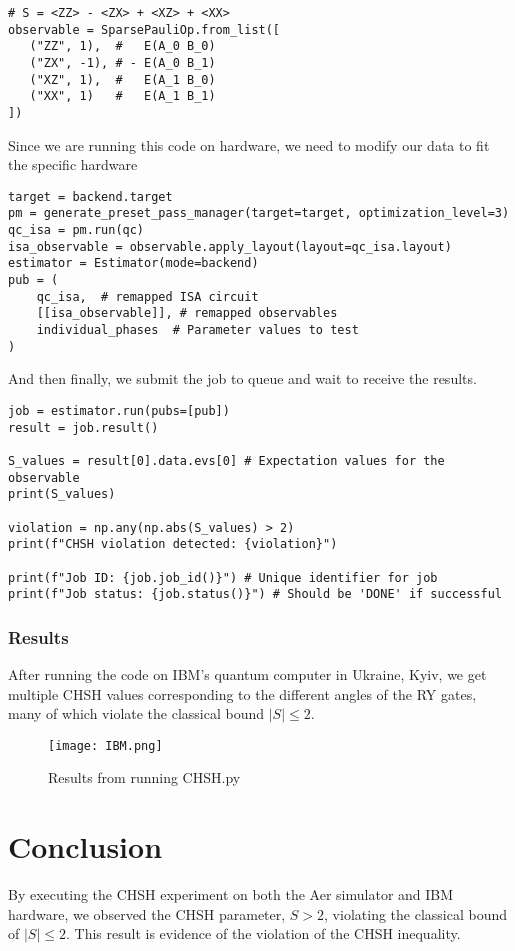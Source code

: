 \documentclass[12pt]{article}
\begin{document}
\begin{lstlisting}[style=python]
# S = <ZZ> - <ZX> + <XZ> + <XX>
observable = SparsePauliOp.from_list([
   ("ZZ", 1),  #   E(A_0 B_0)
   ("ZX", -1), # - E(A_0 B_1)
   ("XZ", 1),  #   E(A_1 B_0)
   ("XX", 1)   #   E(A_1 B_1)
])    
\end{lstlisting}

Since we are running this code on hardware, we need to modify our data to fit the specific hardware

\begin{lstlisting}[style=python]
target = backend.target
pm = generate_preset_pass_manager(target=target, optimization_level=3)
qc_isa = pm.run(qc)
isa_observable = observable.apply_layout(layout=qc_isa.layout)
estimator = Estimator(mode=backend)
pub = (
    qc_isa,  # remapped ISA circuit
    [[isa_observable]], # remapped observables
    individual_phases  # Parameter values to test
)
\end{lstlisting}

And then finally, we submit the job to queue and wait to receive the results.

\begin{lstlisting}[style=python]
job = estimator.run(pubs=[pub])
result = job.result()

S_values = result[0].data.evs[0] # Expectation values for the observable
print(S_values)

violation = np.any(np.abs(S_values) > 2)
print(f"CHSH violation detected: {violation}")

print(f"Job ID: {job.job_id()}") # Unique identifier for job
print(f"Job status: {job.status()}") # Should be 'DONE' if successful
\end{lstlisting}

\subsubsection{Results}

After running the code on IBM's quantum computer in Ukraine, Kyiv, we get multiple CHSH values corresponding to the different angles of the RY gates, many of which violate the classical bound \( |S| \leq 2 \).


\begin{figure}[h]
    \centering
    \texttt{[image: IBM.png]}
    \caption{Results from running CHSH.py}
    \label{fig:results}
\end{figure}


\section{Conclusion}
By executing the CHSH experiment on both the Aer simulator and IBM hardware, we observed the CHSH parameter, \( S > 2 \), violating the classical bound of \( |S| \leq 2 \). This result is evidence of the violation of the CHSH inequality. 
\end{document}

